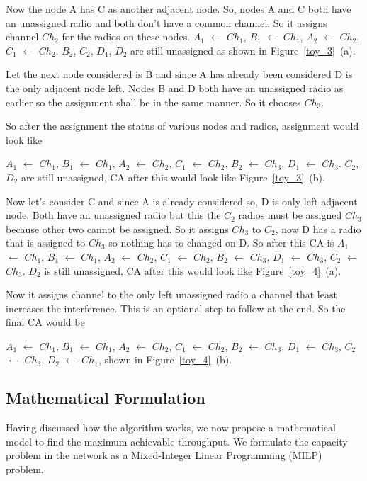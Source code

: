 \documentclass[conference]{IEEEtran}
\begin{document}
Now the node A has C as another adjacent node. 
So, nodes A and C both have an unassigned radio and both don't have a common channel. 
So it assigns channel $Ch_2$ for the radios on these nodes.
$A_1$ $\leftarrow$ $Ch_1$, $B_1$  $\leftarrow$ $Ch_1$,
$A_2$ $\leftarrow$ $Ch_2$, $C_1$  $\leftarrow$ $Ch_2$.
$B_2$, $C_2$, $D_1$, $D_2$ are still unassigned as shown in Figure~\ref{toy_3}~(a).


Let the next node considered is B and since A has already been considered D is the only adjacent node left. 
Nodes B and D both have an unassigned radio as earlier so the assignment shall be in the same manner.
So it chooses $Ch_3$.

So after the assignment the status of various nodes and radios, assignment would look like 

$A_1$ $\leftarrow$ $Ch_1$, $B_1$  $\leftarrow$ $Ch_1$, 
$A_2$ $\leftarrow$ $Ch_2$, $C_1$  $\leftarrow$ $Ch_2$,
$B_2$ $\leftarrow$ $Ch_3$, $D_1$  $\leftarrow$ $Ch_3$.
$C_2$, $D_2$ are still unassigned, CA after this would look like Figure~\ref{toy_3}~(b).


Now let's consider C  and since A is already considered so, D is only left adjacent node.
Both have an unassigned radio but this the $C_2$ radios must be assigned $Ch_3$ because other two cannot be assigned. 
So it assigns $Ch_3$ to $C_2$, now D has a radio that is assigned to $Ch_3$ so nothing has to changed on D. So after this CA is
$A_1$ $\leftarrow$ $Ch_1$, $B_1$  $\leftarrow$ $Ch_1$, 
$A_2$ $\leftarrow$ $Ch_2$, $C_1$  $\leftarrow$ $Ch_2$, 
$B_2$ $\leftarrow$ $Ch_3$, $D_1$  $\leftarrow$ $Ch_3$, 
$C_2$ $\leftarrow$ $Ch_3$. $D_2$ is still unassigned, CA after this would look like Figure~\ref{toy_4}~(a). 

Now it assigns channel to the only left unassigned radio a channel that least increases the interference. This is an optional step to follow at the end. So the final CA would be

$A_1$ $\leftarrow$ $Ch_1$, $B_1$  $\leftarrow$ $Ch_1$, 
$A_2$ $\leftarrow$ $Ch_2$, $C_1$  $\leftarrow$ $Ch_2$, 
$B_2$ $\leftarrow$ $Ch_3$, $D_1$  $\leftarrow$ $Ch_3$, 
$C_2$ $\leftarrow$ $Ch_3$, $D_2$  $\leftarrow$ $Ch_1$, shown in Figure~\ref{toy_4}~(b).



\subsection{Mathematical Formulation}
Having discussed how the algorithm works, we now propose a mathematical model to find the maximum achievable throughput.
We formulate the capacity problem in the  network as a Mixed-Integer Linear Programming (MILP) problem.
\end{document}
